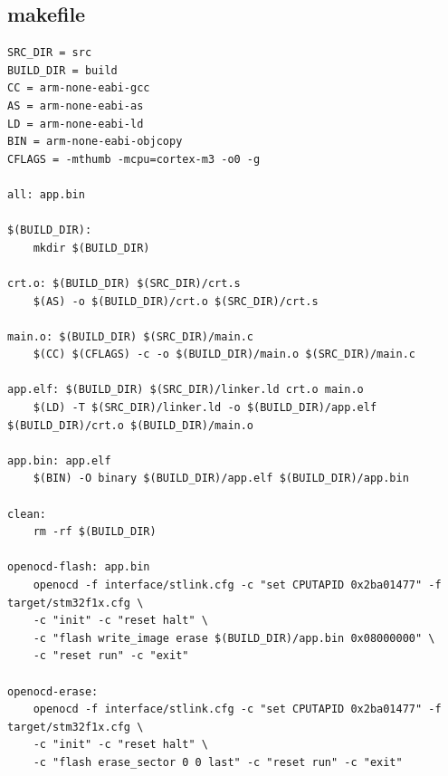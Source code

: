 \subsection{makefile}
\begin{lstlisting}[language=MyMake]
SRC_DIR = src
BUILD_DIR = build
CC = arm-none-eabi-gcc
AS = arm-none-eabi-as
LD = arm-none-eabi-ld
BIN = arm-none-eabi-objcopy
CFLAGS = -mthumb -mcpu=cortex-m3 -o0 -g

all: app.bin

$(BUILD_DIR):
	mkdir $(BUILD_DIR)

crt.o: $(BUILD_DIR) $(SRC_DIR)/crt.s
	$(AS) -o $(BUILD_DIR)/crt.o $(SRC_DIR)/crt.s

main.o: $(BUILD_DIR) $(SRC_DIR)/main.c
	$(CC) $(CFLAGS) -c -o $(BUILD_DIR)/main.o $(SRC_DIR)/main.c

app.elf: $(BUILD_DIR) $(SRC_DIR)/linker.ld crt.o main.o
	$(LD) -T $(SRC_DIR)/linker.ld -o $(BUILD_DIR)/app.elf $(BUILD_DIR)/crt.o $(BUILD_DIR)/main.o 

app.bin: app.elf
	$(BIN) -O binary $(BUILD_DIR)/app.elf $(BUILD_DIR)/app.bin

clean:
	rm -rf $(BUILD_DIR)

openocd-flash: app.bin
	openocd -f interface/stlink.cfg -c "set CPUTAPID 0x2ba01477" -f target/stm32f1x.cfg \
	-c "init" -c "reset halt" \
	-c "flash write_image erase $(BUILD_DIR)/app.bin 0x08000000" \
	-c "reset run" -c "exit"

openocd-erase:
	openocd -f interface/stlink.cfg -c "set CPUTAPID 0x2ba01477" -f target/stm32f1x.cfg \
	-c "init" -c "reset halt" \
	-c "flash erase_sector 0 0 last" -c "reset run" -c "exit"

\end{lstlisting}